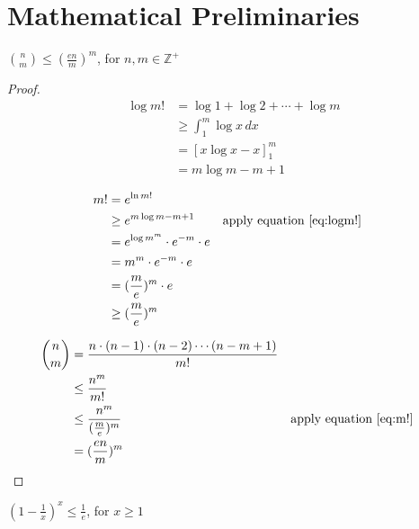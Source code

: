 \chapter{Mathematical Preliminaries}

\begin{lemma}
\label{lemma:nchoosem}

$\binom{n}{m} \le (\frac{en}{m})^m$, for $n, m \in \mathbb{Z}^+$

\end{lemma}

\begin{proof}
\begin{align}
\log m! 
    &= \log 1 + \log 2 + \cdots + \log m \nonumber \\
    &\ge \int_1^m \log x \, dx \nonumber \\
    &= [x \log x - x]_1^m \nonumber \\
    &= m \log m - m + 1 \label{eq:logm!}
\end{align}

\begin{align}
m! 
    &= e^{\ln m!} \nonumber \\
    &\ge e^{m \log m - m + 1} \nonumber 
    && \text{apply equation \ref{eq:logm!}} \\
    &= e^{\log m^m} \cdot e^{-m} \cdot e \nonumber \\
    &= m^m \cdot e^{-m} \cdot e \nonumber \\
    &= (\frac{m}{e})^m \cdot e \nonumber \\
    &\ge (\frac{m}{e})^m \label{eq:m!}
\end{align}


\begin{align}
\binom{n}{m} 
    &= \frac{n \cdot (n-1) \cdot (n-2) \cdots (n-m+1)}{m!} \nonumber \\
    &\le \frac{n^m}{m!} \nonumber \\
    &\le \frac{n^m}{(\frac{m}{e})^m} \nonumber 
    && \text{apply equation \ref{eq:m!}} \\
    &= (\frac{en}{m})^m
\end{align}

\end{proof}

\begin{lemma}
\label{lemma:(1-1x)x}

$(1 - \frac{1}{x})^x \le \frac{1}{e}$, for $x \ge 1$

\end{lemma}

